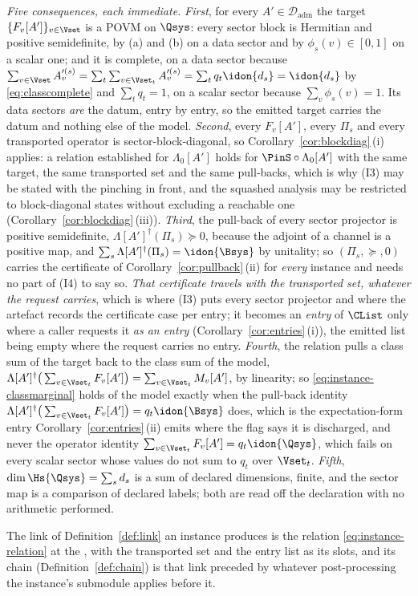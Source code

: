 \begin{definition}
\emph{Five consequences, each immediate.} \emph{First}, for every
$A'\in\mathcal{D}_{\mathrm{adm}}$ the target $\{F_v[A']\}_{v\in\Vset}$ is a
POVM on $\Qsys$: every sector block is Hermitian and positive semidefinite,
by (a) and (b) on a data sector and by $\phi_s(v)\in[0,1]$ on a scalar one;
and it is complete, on a data sector because
$\sum_{v\in\Vset}A'^{(s)}_v=\sum_{t}\sum_{v\in\Vset_t}A'^{(s)}_v
=\sum_tq_t\idon{d_s}=\idon{d_s}$ by \eqref{eq:classcomplete} and
$\sum_tq_t=1$, on a scalar sector because $\sum_v\phi_s(v)=1$. Its data
sectors \emph{are} the datum, entry by entry, so the emitted target carries
the datum and nothing else of the model. \emph{Second}, every $F_v[A']$,
every $\Pi_s$ and every transported operator is sector-block-diagonal, so
Corollary~\ref{cor:blockdiag}\,(i) applies: a relation established for
$\Lambda_0[A']$ holds for $\PinS\circ\Lambda_0[A']$ with the same target,
the same transported set and the same pull-backs, which is why (I3) may be
stated with the pinching in front, and the squashed analysis may be
restricted to block-diagonal states without excluding a reachable one
(Corollary~\ref{cor:blockdiag}\,(iii)). \emph{Third}, the pull-back of every
sector projector is positive semidefinite, $\Lambda[A']^{\dagger}(\Pi_s)
\succeq0$, because the adjoint of a channel is a positive map, and
$\sum_s\Lambda[A']^{\dagger}(\Pi_s)=\idon{\Bsys}$ by unitality; so
$(\Pi_s,\succeq,0)$ carries the certificate of
Corollary~\ref{cor:pullback}\,(ii) for \emph{every} instance and needs no
part of (I4) to say so. \emph{That certificate travels with the transported
set, whatever the request carries}, which is where (I3) puts every sector
projector and where the artefact records the certificate case per entry; it
becomes an \emph{entry} of $\CList$ only where a caller requests it \emph{as
an entry} (Corollary~\ref{cor:entries}\,(i)), the emitted list being empty
where the request carries no entry. \emph{Fourth}, the relation pulls a class
sum of the target back to the class sum of the model,
$\Lambda[A']^{\dagger}\big(\sum_{v\in\Vset_t}F_v[A']\big)
=\sum_{v\in\Vset_t}M_v[A']$, by linearity; so
\eqref{eq:instance-classmarginal} holds of the model exactly when the
pull-back identity $\Lambda[A']^{\dagger}\big(\sum_{v\in\Vset_t}F_v[A']\big)
=q_t\idon{\Bsys}$ does, which is the expectation-form entry
Corollary~\ref{cor:entries}\,(ii) emits where the flag says it is discharged,
and never the operator identity
$\sum_{v\in\Vset_t}F_v[A']=q_t\idon{\Qsys}$, which fails on every scalar
sector whose values do not sum to $q_t$ over $\Vset_t$. \emph{Fifth},
$\dim\Hs{\Qsys}=\sum_sd_s$ is a sum of declared dimensions, finite, and the
sector map is a comparison of declared labels; both are read off the
declaration with no arithmetic performed.

The link of Definition~\ref{def:link} an instance produces is the relation
\eqref{eq:instance-relation} at the , with the transported set
and the entry list as its slots, and its chain (Definition~\ref{def:chain})
is that link preceded by whatever post-processing the instance's submodule
applies before it.
\end{definition}
